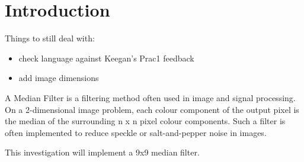 \section{Introduction}
Things to still deal with:
\begin{itemize}
	\item check language against Keegan's Prac1 feedback
	\item add image dimensions
\end{itemize}
A Median Filter is a filtering method often used in image and signal processing. On a 2-dimensional image problem, each colour component of the output pixel is the median of the surrounding n x n pixel colour components. Such a filter is often implemented to reduce speckle or salt-and-pepper noise in images\cite{NSP}.

This investigation will implement a 9x9 median filter.

